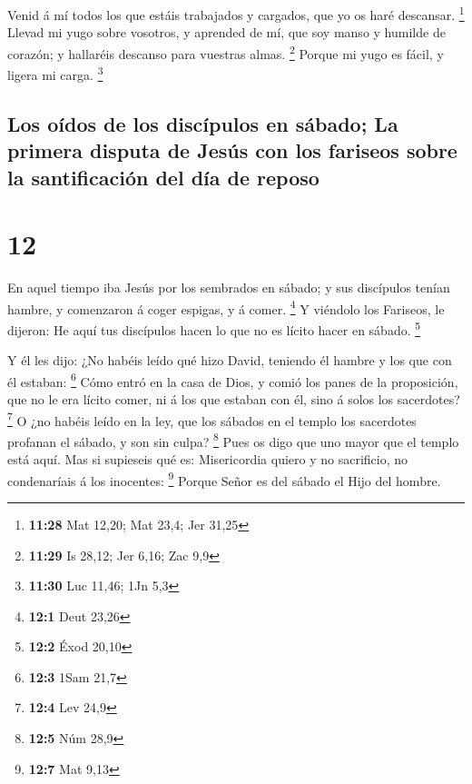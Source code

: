  Venid á mí todos los que estáis trabajados y cargados,
que yo os haré descansar. \footnote{\textbf{11:28} Mat 12,20; Mat 23,4;
  Jer 31,25}  Llevad mi yugo sobre vosotros, y aprended
de mí, que soy manso y humilde de corazón; y hallaréis descanso para
vuestras almas. \footnote{\textbf{11:29} Is 28,12; Jer 6,16; Zac 9,9}
 Porque mi yugo es fácil, y ligera mi carga. \footnote{\textbf{11:30}
  Luc 11,46; 1Jn 5,3}

\hypertarget{los-ouxeddos-de-los-discuxedpulos-en-suxe1bado-la-primera-disputa-de-jesuxfas-con-los-fariseos-sobre-la-santificaciuxf3n-del-duxeda-de-reposo}{%
\subsection{Los oídos de los discípulos en sábado; La primera disputa de
Jesús con los fariseos sobre la santificación del día de
reposo}\label{los-ouxeddos-de-los-discuxedpulos-en-suxe1bado-la-primera-disputa-de-jesuxfas-con-los-fariseos-sobre-la-santificaciuxf3n-del-duxeda-de-reposo}}

\hypertarget{section-11}{%
\section{12}\label{section-11}}

 En aquel tiempo iba Jesús por los sembrados en sábado; y
sus discípulos tenían hambre, y comenzaron á coger espigas, y á comer.
\footnote{\textbf{12:1} Deut 23,26}  Y viéndolo los
Fariseos, le dijeron: He aquí tus discípulos hacen lo que no es lícito
hacer en sábado. \footnote{\textbf{12:2} Éxod 20,10}

 Y él les dijo: ¿No habéis leído qué hizo David, teniendo
él hambre y los que con él estaban: \footnote{\textbf{12:3} 1Sam 21,7}
 Cómo entró en la casa de Dios, y comió los panes de la
proposición, que no le era lícito comer, ni á los que estaban con él,
sino á solos los sacerdotes? \footnote{\textbf{12:4} Lev 24,9}
 O ¿no habéis leído en la ley, que los sábados en el
templo los sacerdotes profanan el sábado, y son sin culpa? \footnote{\textbf{12:5}
  Núm 28,9}  Pues os digo que uno mayor que el templo está
aquí.  Mas si supieseis qué es: Misericordia quiero y no
sacrificio, no condenaríais á los inocentes: \footnote{\textbf{12:7} Mat
  9,13}  Porque Señor es del sábado el Hijo del hombre.

